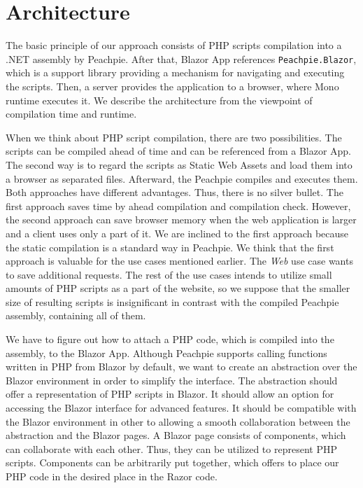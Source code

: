 \section{Architecture}

The basic principle of our approach consists of PHP scripts compilation into a .NET assembly by Peachpie.
After that, Blazor App references \texttt{Peachpie.Bla\-zor}, which is a support library providing a mechanism for navigating and executing the scripts.
Then, a server provides the application to a browser, where Mono runtime executes it.
We describe the architecture from the viewpoint of compilation time and runtime.
\par
When we think about PHP script compilation, there are two possibilities.
The scripts can be compiled ahead of time and can be referenced from a Blazor App. 
The second way is to regard the scripts as Static Web Assets and load them into a browser as separated files.
Afterward, the Peachpie compiles and executes them.
Both approaches have different advantages. 
Thus, there is no silver bullet.
The first approach saves time by ahead compilation and compilation check.
However, the second approach can save browser memory when the web application is larger and a client uses only a part of it.
We are inclined to the first approach because the static compilation is a standard way in Peachpie.
We think that the first approach is valuable for the use cases mentioned earlier.
The \textit{Web} use case wants to save additional requests. 
The rest of the use cases intends to utilize small amounts of PHP scripts as a part of the website, so we suppose that the smaller size of resulting scripts is insignificant in contrast with the compiled Peachpie assembly, containing all of them. 
\par
We have to figure out how to attach a PHP code, which is compiled into the assembly, to the Blazor App.
Although Peachpie supports calling functions written in PHP from Blazor by default, we want to create an abstraction over the Blazor environment in order to simplify the interface.
The abstraction should offer a representation of PHP scripts in Blazor.
It should allow an option for accessing the Blazor interface for advanced features.
It should be compatible with the Blazor environment in other to allowing a smooth collaboration between the abstraction and the Blazor pages.
A Blazor page consists of components, which can collaborate with each other.
Thus, they can be utilized to represent PHP scripts.
Components can be arbitrarily put together, which offers to place our PHP code in the desired place in the Razor code.
